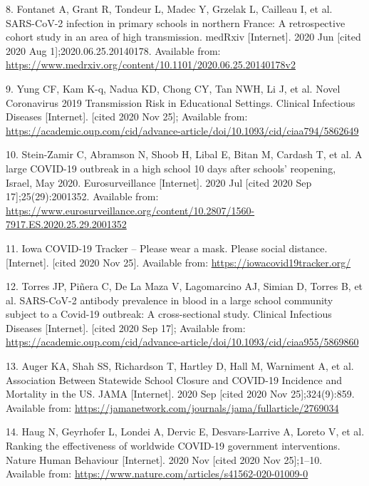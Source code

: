 \documentclass[
]{article}
\begin{document}
\leavevmode\hypertarget{ref-fontanet_sars-cov-2_2020}{}%
8. Fontanet A, Grant R, Tondeur L, Madec Y, Grzelak L, Cailleau I, et
al. SARS-CoV-2 infection in primary schools in northern France: A
retrospective cohort study in an area of high transmission. medRxiv
{[}Internet{]}. 2020 Jun {[}cited 2020 Aug 1{]};2020.06.25.20140178.
Available from:
\url{https://www.medrxiv.org/content/10.1101/2020.06.25.20140178v2}

\leavevmode\hypertarget{ref-yung_novel_nodate}{}%
9. Yung CF, Kam K-q, Nadua KD, Chong CY, Tan NWH, Li J, et al. Novel
Coronavirus 2019 Transmission Risk in Educational Settings. Clinical
Infectious Diseases {[}Internet{]}. {[}cited 2020 Nov 25{]}; Available
from:
\url{https://academic.oup.com/cid/advance-article/doi/10.1093/cid/ciaa794/5862649}

\leavevmode\hypertarget{ref-stein-zamir_large_2020}{}%
10. Stein-Zamir C, Abramson N, Shoob H, Libal E, Bitan M, Cardash T, et
al. A large COVID-19 outbreak in a high school 10 days after schools'
reopening, Israel, May 2020. Eurosurveillance {[}Internet{]}. 2020 Jul
{[}cited 2020 Sep 17{]};25(29):2001352. Available from:
\url{https://www.eurosurveillance.org/content/10.2807/1560-7917.ES.2020.25.29.2001352}

\leavevmode\hypertarget{ref-noauthor_iowa_nodate}{}%
11. Iowa COVID-19 Tracker -- Please wear a mask. Please social distance.
{[}Internet{]}. {[}cited 2020 Nov 25{]}. Available from:
\url{https://iowacovid19tracker.org/}

\leavevmode\hypertarget{ref-torres_sars-cov-2_nodate}{}%
12. Torres JP, Piñera C, De La Maza V, Lagomarcino AJ, Simian D, Torres
B, et al. SARS-CoV-2 antibody prevalence in blood in a large school
community subject to a Covid-19 outbreak: A cross-sectional study.
Clinical Infectious Diseases {[}Internet{]}. {[}cited 2020 Sep 17{]};
Available from:
\url{https://academic.oup.com/cid/advance-article/doi/10.1093/cid/ciaa955/5869860}

\leavevmode\hypertarget{ref-auger_association_2020}{}%
13. Auger KA, Shah SS, Richardson T, Hartley D, Hall M, Warniment A, et
al. Association Between Statewide School Closure and COVID-19 Incidence
and Mortality in the US. JAMA {[}Internet{]}. 2020 Sep {[}cited 2020 Nov
25{]};324(9):859. Available from:
\url{https://jamanetwork.com/journals/jama/fullarticle/2769034}

\leavevmode\hypertarget{ref-haug_ranking_2020}{}%
14. Haug N, Geyrhofer L, Londei A, Dervic E, Desvars-Larrive A, Loreto
V, et al. Ranking the effectiveness of worldwide COVID-19 government
interventions. Nature Human Behaviour {[}Internet{]}. 2020 Nov {[}cited
2020 Nov 25{]};1--10. Available from:
\url{https://www.nature.com/articles/s41562-020-01009-0}
\end{document}
